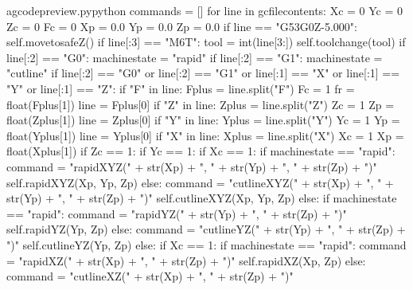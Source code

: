 \documentclass{ltxdoc}
\begin{document}
\begin{writecode}{a}{gcodepreview.py}{python}
        commands = []        
        for line in gcfilecontents:
            Xc = 0
            Yc = 0
            Zc = 0
            Fc = 0
            Xp = 0.0
            Yp = 0.0
            Zp = 0.0
            if line == "G53G0Z-5.000\n":
                 self.movetosafeZ()
            if line[:3] == "M6T":
                tool = int(line[3:])
                self.toolchange(tool)
            if line[:2] == "G0":
                machinestate = "rapid"
            if line[:2] == "G1":
                machinestate = "cutline"
            if line[:2] == "G0" or line[:2] == "G1" or line[:1] == "X" or line[:1] == "Y" or line[:1] == "Z":
                if "F" in line:
                    Fplus = line.split("F")
                    Fc = 1
                    fr = float(Fplus[1])
                    line = Fplus[0]
                if "Z" in line:
                    Zplus = line.split("Z")
                    Zc = 1
                    Zp = float(Zplus[1])
                    line = Zplus[0]
                if "Y" in line:
                    Yplus = line.split("Y")
                    Yc = 1
                    Yp = float(Yplus[1])
                    line = Yplus[0]
                if "X" in line:
                    Xplus = line.split("X")
                    Xc = 1
                    Xp = float(Xplus[1])
                if Zc == 1:
                    if Yc == 1:
                        if Xc == 1:
                            if machinestate == "rapid":
                                command = "rapidXYZ(" + str(Xp) + ", " + str(Yp) + ", " + str(Zp) + ")"
                                self.rapidXYZ(Xp, Yp, Zp)
                            else: 
                                command = "cutlineXYZ(" + str(Xp) + ", " + str(Yp) + ", " + str(Zp) + ")"
                                self.cutlineXYZ(Xp, Yp, Zp)
                        else:
                            if machinestate == "rapid":
                                command = "rapidYZ(" + str(Yp) + ", " + str(Zp) + ")"
                                self.rapidYZ(Yp, Zp)
                            else: 
                                command = "cutlineYZ(" + str(Yp) + ", " + str(Zp) + ")"
                                self.cutlineYZ(Yp, Zp)
                    else:
                        if Xc == 1:
                            if machinestate == "rapid":
                                command = "rapidXZ(" + str(Xp) + ", " + str(Zp) + ")"
                                self.rapidXZ(Xp, Zp)
                            else: 
                                command = "cutlineXZ(" + str(Xp) + ", " + str(Zp) + ")"

\end{writecode}
\end{document}
